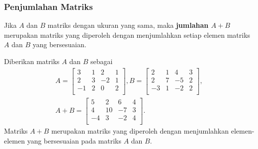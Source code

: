 \subsubsection{Penjumlahan Matriks}
\begin{definisi}
    Jika $A$ dan $B$ matriks dengan ukuran yang sama, maka \textbf{jumlahan $A+B$} merupakan matriks yang diperoleh dengan menjumlahkan setiap elemen matriks $A$ dan $B$ yang bersesuaian.
\end{definisi}
\begin{contoh}
Diberikan matriks $A$ dan $B$ sebagai
\begin{gather*} 
        A=
        \begin{bmatrix}
        3 & 1 & 2 & 1\\
        2 & 3 & -2 & 1\\
        -1 & 2 & 0 & 2\\
        \end{bmatrix}
        ,B=
        \begin{bmatrix}
        2 & 1 & 4 & 3\\
        2 & 7 & -5 & 2\\
        -3 & 1 & -2 & 2\\
        \end{bmatrix}, \\
        A+B=
        \begin{bmatrix}
        5 & 2 & 6 & 4\\
        4 & 10 & -7 & 3\\
        -4 & 3 & -2 & 4\\
        \end{bmatrix}.
\end{gather*}
Matriks $A+B$ merupakan matriks yang diperoleh dengan menjumlahkan elemen-elemen yang bersesuaian pada matriks $A$ dan $B$.
\end{contoh}

